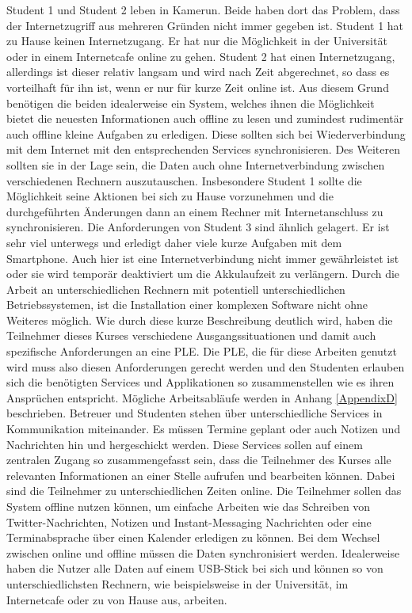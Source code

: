 Student 1 und Student 2 leben in Kamerun. Beide haben dort das Problem, dass der Internetzugriff aus mehreren Gründen nicht immer gegeben ist. Student 1 hat zu Hause keinen Internetzugang. Er hat nur die Möglichkeit in der Universität oder in einem Internetcafe online zu gehen. Student 2 hat einen Internetzugang, allerdings ist dieser relativ langsam und wird nach Zeit abgerechnet, so dass es vorteilhaft für ihn ist, wenn er nur für kurze Zeit online ist. Aus diesem Grund benötigen die beiden idealerweise ein System, welches ihnen die Möglichkeit bietet die neuesten Informationen auch offline zu lesen und zumindest rudimentär auch offline kleine Aufgaben zu erledigen. Diese sollten sich bei Wiederverbindung mit dem Internet mit den entsprechenden Services synchronisieren. Des Weiteren sollten sie in der Lage sein, die Daten auch ohne Internetverbindung zwischen verschiedenen Rechnern auszutauschen. Insbesondere Student 1 sollte die Möglichkeit seine Aktionen bei sich zu Hause vorzunehmen und die durchgeführten Änderungen dann an einem Rechner mit Internetanschluss zu synchronisieren. Die Anforderungen von Student 3 sind ähnlich gelagert. Er ist sehr viel unterwegs und erledigt daher viele kurze Aufgaben mit dem Smartphone. Auch hier ist eine Internetverbindung nicht immer gewährleistet ist oder sie wird temporär deaktiviert um die Akkulaufzeit zu verlängern. Durch die Arbeit an unterschiedlichen Rechnern mit potentiell unterschiedlichen Betriebssystemen, ist die Installation einer komplexen Software nicht ohne Weiteres möglich. Wie durch diese kurze Beschreibung deutlich wird, haben die Teilnehmer dieses Kurses verschiedene Ausgangssituationen und damit auch spezifische Anforderungen an eine \ac{PLE}. Die \ac{PLE}, die für diese Arbeiten genutzt wird muss also diesen Anforderungen gerecht werden und den Studenten erlauben sich die benötigten Services und Applikationen so zusammenstellen wie es ihren Ansprüchen entspricht. Mögliche Arbeitsabläufe werden in Anhang \ref{AppendixD} beschrieben. Betreuer und Studenten stehen über unterschiedliche Services in Kommunikation miteinander. Es müssen Termine geplant oder auch Notizen und Nachrichten hin und hergeschickt werden. Diese Services sollen auf einem zentralen Zugang so zusammengefasst sein, dass die Teilnehmer des Kurses alle relevanten Informationen an einer Stelle aufrufen und bearbeiten können. Dabei sind die Teilnehmer zu unterschiedlichen Zeiten online. Die Teilnehmer sollen das System offline nutzen können, um einfache Arbeiten wie das Schreiben von Twitter-Nachrichten, Notizen und Instant-Messaging Nachrichten oder eine Terminabsprache über einen Kalender erledigen zu können. Bei dem Wechsel zwischen online und offline müssen die Daten synchronisiert werden. Idealerweise haben die Nutzer alle Daten auf einem USB-Stick bei sich und können so von unterschiedlichsten Rechnern, wie beispielsweise in der Universität, im Internetcafe oder zu von Hause aus, arbeiten.


